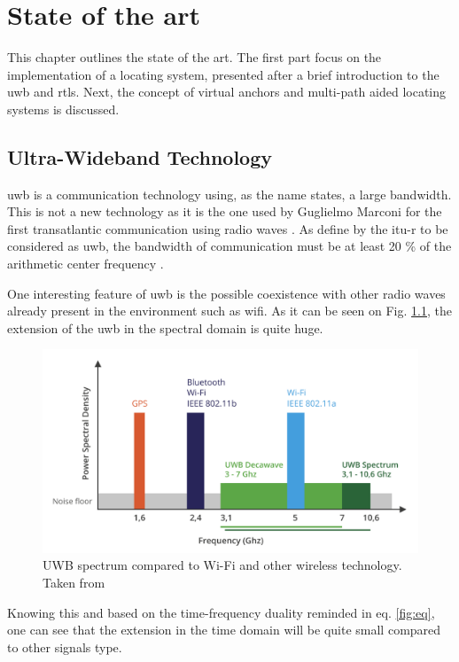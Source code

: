 % 			 
%
%

\chapter{State of the art}
\label{stateoftheart}

This chapter outlines the state of the art. The first part focus on the implementation of a locating system, presented after a brief introduction to the \gls{uwb} and \gls{rtls}. Next, the concept of virtual anchors and multi-path aided locating systems is discussed.


\section{Ultra-Wideband Technology}
\label{uwb}
\gls{uwb} is a communication technology using, as the name states, a large bandwidth. This is not a new technology as it is the one used by  Guglielmo Marconi for the first transatlantic communication using radio waves \cite{nekoogar2005uwb}. As define by the \gls{itu-r} to be considered as \gls{uwb}, the bandwidth of communication must be at least 20 \% of the arithmetic center frequency \cite{itur2006characteristics}.
\vspace{2mm}

One interesting feature of \gls{uwb} is the possible coexistence with other radio waves already present in the environment such as \gls{wifi}. As it can be seen on Fig. \ref{fig:UWB_Techonology}, the extension of the \gls{uwb} in the spectral domain is quite huge. 

\begin{figure}[H]
\includegraphics[width=.6\linewidth]{Images/uwb_bandwidth.png}
\centering
\caption{UWB spectrum compared to Wi-Fi and other wireless technology. Taken from \cite{itur2006characteristics}}
\label{fig:UWB_Techonology}
\end{figure} 

Knowing this and based on the time-frequency duality reminded in eq. \ref{fig:eq}, one can see that the extension in the time domain will be quite small compared to other signals type.

